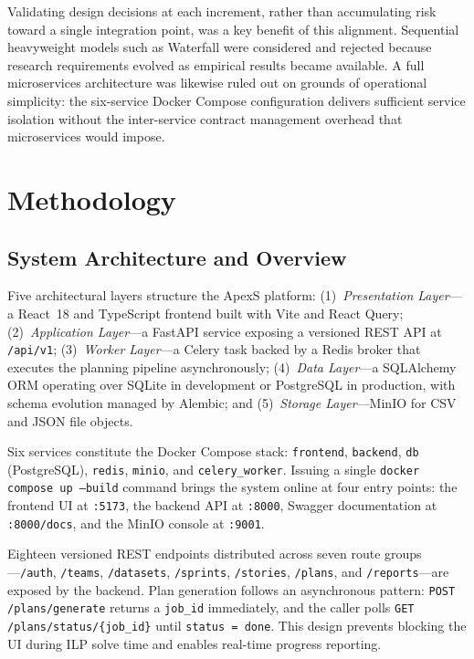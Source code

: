 \documentclass[conference]{IEEEtran}
\begin{document}
Validating design decisions at each increment, rather than accumulating risk toward
a single integration point, was a key benefit of this alignment.
Sequential heavyweight models such as Waterfall were considered and rejected because
research requirements evolved as empirical results became available.
A full microservices architecture was likewise ruled out on grounds of operational
simplicity: the six-service Docker Compose configuration delivers sufficient service
isolation without the inter-service contract management overhead that microservices
would impose.

\section{Methodology}
\label{sec:methodology}

\subsection{System Architecture and Overview}

Five architectural layers structure the ApexS platform:
(1)~\emph{Presentation Layer}---a React~18 and TypeScript frontend built with Vite
and React Query;
(2)~\emph{Application Layer}---a FastAPI service exposing a versioned REST API
at \texttt{/api/v1};
(3)~\emph{Worker Layer}---a Celery task backed by a Redis broker that executes the
planning pipeline asynchronously;
(4)~\emph{Data Layer}---a SQLAlchemy ORM operating over SQLite in development or
PostgreSQL in production, with schema evolution managed by Alembic; and
(5)~\emph{Storage Layer}---MinIO for CSV and JSON file objects.

Six services constitute the Docker Compose stack: \texttt{frontend},
\texttt{backend}, \texttt{db} (PostgreSQL), \texttt{redis}, \texttt{minio}, and
\texttt{celery\_worker}.
Issuing a single \texttt{docker compose up --build} command brings the system online
at four entry points: the frontend UI at \texttt{:5173}, the backend API at
\texttt{:8000}, Swagger documentation at \texttt{:8000/docs}, and the MinIO console
at \texttt{:9001}.

Eighteen versioned REST endpoints distributed across seven route groups---\texttt{/auth},
\texttt{/teams}, \texttt{/datasets}, \texttt{/sprints}, \texttt{/stories},
\texttt{/plans}, and \texttt{/reports}---are exposed by the backend.
Plan generation follows an asynchronous pattern: \texttt{POST /plans/generate}
returns a \texttt{job\_id} immediately, and the caller polls
\texttt{GET /plans/status/\{job\_id\}} until \texttt{status = done}.
This design prevents blocking the UI during ILP solve time and enables real-time
progress reporting.
\end{document}
